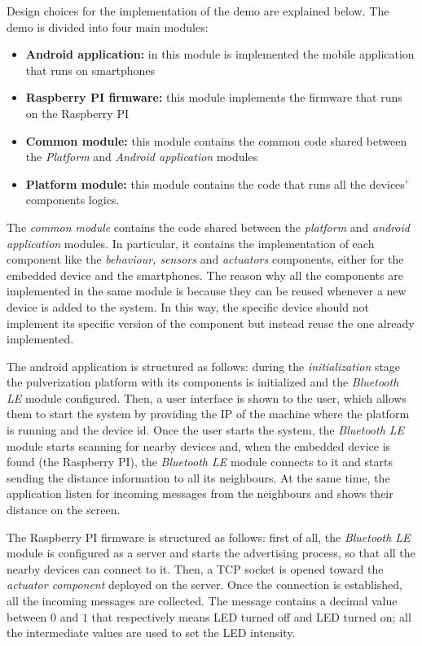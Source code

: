 Design choices for the implementation of the demo are explained below. The demo is divided into four main modules:

\begin{itemize}
	\item \textbf{Android application:} in this module is implemented the mobile application that runs on smartphones
	\item \textbf{Raspberry PI firmware:} this module implements the firmware that runs on the Raspberry PI
	\item \textbf{Common module:} this module contains the common code shared between the \emph{Platform} and \emph{Android application} modules
	\item \textbf{Platform module:} this module contains the code that runs all the devices' components logics.
\end{itemize}

The \emph{common module} contains the code shared between the \emph{platform} and \emph{android application} modules. In particular, it contains
the implementation of each component like the \emph{behaviour, sensors} and \emph{actuators} components, either for the embedded device and the
smartphones. The reason why all the components are implemented in the same module is because they can be reused whenever a new device is added to the
system. In this way, the specific device should not implement its specific version of the component but instead reuse the one already implemented.

The android application is structured as follows: during the \emph{initialization} stage the pulverization platform with its components is
initialized and the \emph{Bluetooth LE} module configured. Then, a user interface is shown to the user, which allows them to start the system by
providing the IP of the machine where the platform is running and the device id. Once the user starts the system, the \emph{Bluetooth LE} module
starts scanning for nearby devices and, when the embedded device is found (the Raspberry PI), the \emph{Bluetooth LE} module connects to it and
starts sending the distance information to all its neighbours. At the same time, the application listen for incoming messages from the neighbours
and shows their distance on the screen.

The Raspberry PI firmware is structured as follows: first of all, the \emph{Bluetooth LE} module is configured as a server and starts the
advertising process, so that all the nearby devices can connect to it. Then, a TCP socket is opened toward the \emph{actuator component} deployed
on the server. Once the connection is established, all the incoming messages are collected. The message contains a decimal value between $0$ and $1$
that respectively means LED turned off and LED turned on; all the intermediate values are used to set the LED intensity.

